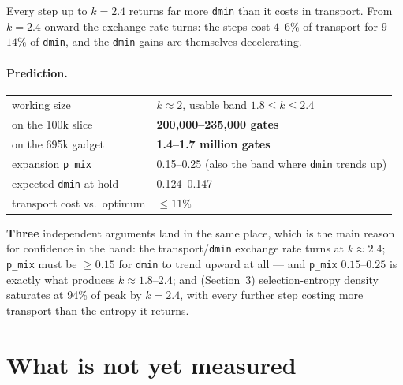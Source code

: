 \documentclass[11pt]{article}
\begin{document}
Every step up to $k=2.4$ returns far more \texttt{dmin} than it costs in
transport. From $k=2.4$ onward the exchange rate turns: the steps cost $4$--$6\%$
of transport for $9$--$14\%$ of \texttt{dmin}, and the \texttt{dmin} gains are
themselves decelerating.

\paragraph{Prediction.}
\begin{center}
\begin{tabular}{ll}
\toprule
working size & $k \approx 2$, usable band $1.8 \le k \le 2.4$ \\
on the 100k slice & \textbf{200{,}000--235{,}000 gates} \\
on the 695k gadget & \textbf{1.4--1.7 million gates} \\
expansion \texttt{p\_mix} & 0.15--0.25 (also the band where \texttt{dmin} trends up) \\
expected \texttt{dmin} at hold & 0.124--0.147 \\
transport cost vs.\ optimum & $\le 11\%$ \\
\bottomrule
\end{tabular}
\end{center}

\textbf{Three} independent arguments land in the same place, which is the main
reason for confidence in the band: the transport/\texttt{dmin} exchange rate
turns at $k \approx 2.4$; \texttt{p\_mix} must be $\ge 0.15$ for \texttt{dmin}
to trend upward at all --- and \texttt{p\_mix} $0.15$--$0.25$ is exactly what
produces $k \approx 1.8$--$2.4$; and (Section~3) selection-entropy density
saturates at 94\% of peak by $k = 2.4$, with every further step costing more
transport than the entropy it returns.

\section{What is not yet measured}
\end{document}
